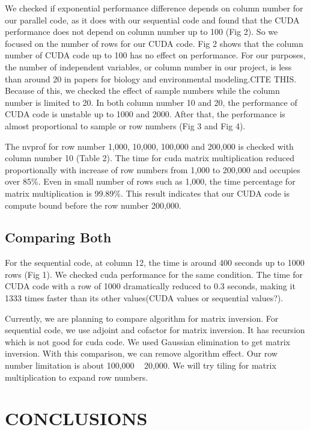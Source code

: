 \documentclass[letterpaper, 10 pt, conference]{ieeeconf}  %
\begin{document}
We checked if exponential performance difference depends on column number for our parallel code, as it does with our sequential code and found that the CUDA performance does not depend on column number up to 100 (Fig 2). So we focused on the number of rows for our CUDA code. Fig 2 shows that the column number of CUDA code up to 100 has no effect on performance. For our purposes, the number of independent variables, or column number in our project, is less than around 20 in papers for biology and environmental modeling.CITE THIS. Because of this, we checked the effect of sample numbers while the column number is limited to 20. In both column number 10 and 20, the performance of CUDA code is unstable up to 1000 and 2000. After that, the performance is almost proportional to sample or row numbers (Fig 3 and Fig 4).

The nvprof for row number 1,000, 10,000, 100,000 and 200,000 is checked with column number 10 (Table 2).  The time for cuda matrix multiplication reduced proportionally with increase of row numbers from 1,000 to 200,000 and occupies over 85\%. Even in small number of rows such as 1,000, the time percentage for matrix multiplication is 99.89\%. This result indicates that our CUDA code is compute bound before the row number 200,000. 


\subsection{Comparing Both}

For the sequential code, at column 12, the time is around 400 seconds up to 1000 rows (Fig 1). We checked cuda performance for the same condition. The time for CUDA code with a row of 1000 dramatically reduced to 0.3 seconds, making it 1333 times faster than its other values(CUDA values or sequential values?). 

Currently, we are planning to compare algorithm for matrix inversion. For sequential code, we use adjoint and cofactor for matrix inversion. It has recursion which is not good for cuda code. We used Gaussian elimination to get matrix inversion. With this comparison, we can remove algorithm effect. Our row number limitation is about 100,000 ~ 20,000. We will try tiling for matrix multiplication to expand row numbers.  


\section{CONCLUSIONS}
\end{document}
